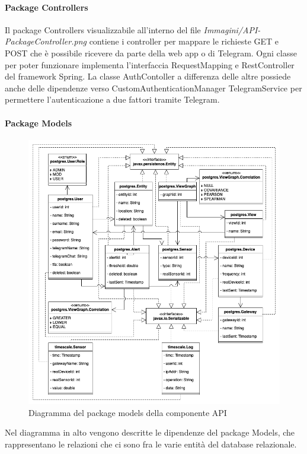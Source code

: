 		\paragraph{Package Controllers}
		Il package Controllers visualizzabile all'interno del file \textit{Immagini/API-PackageController.png} contiene i controller per mappare le richieste GET e POST che è possibile ricevere da parte della web app o di Telegram.
		\newline
		Ogni classe per poter funzionare implementa l'interfaccia RequestMapping e RestController del framework Spring.
		\newline
		La classe AuthContoller a differenza delle altre possiede anche delle dipendenze verso CustomAuthenticationManager TelegramService per permettere l'autenticazione a due fattori tramite Telegram.
		\paragraph*{Package Models}
		\begin{figure}[H]
			\centering
			\includegraphics[scale=0.550]{res/images/API/ModelsPackage.png}
			\caption{Diagramma del package models della componente API}
			\label{Diagramma 14}
		\end{figure}
		Nel diagramma in alto vengono descritte le dipendenze del package Models, che rappresentano le relazioni che ci sono fra le varie entità del database relazionale. 
